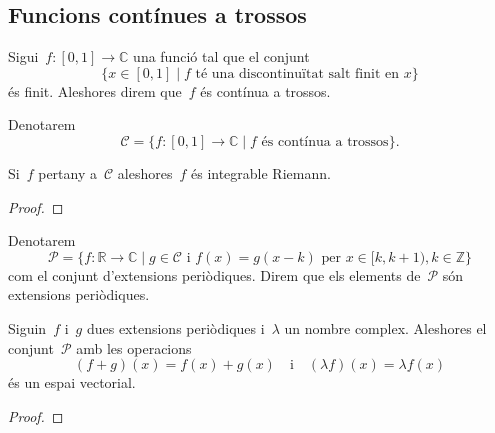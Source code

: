 \documentclass[../../main.tex]{subfiles}
\begin{document}
    \subsection{Funcions contínues a trossos}
    \begin{definition}
        \label{def:funció contínua a trossos}
        Sigui~\(f\colon[0,1]\longrightarrow\mathbb{C}\) una funció tal que el conjunt
        \[
            \{x\in[0,1]\mid f\text{ té una discontinuïtat salt finit en }x\}
        \]
        és finit.
        Aleshores direm que~\(f\) és contínua a trossos.

        Denotarem
        \[
            \mathcal{C}=\{f\colon[0,1]\longrightarrow\mathbb{C}\mid f\text{ és contínua a trossos}\}.
        \]
    \end{definition}
    \begin{observation}
        \label{obs:les funcions contínues a trossos són integrables}
        Si~\(f\) pertany a~\(\mathcal{C}\) aleshores~\(f\) és integrable Riemann.
        \begin{proof}
        \end{proof}
    \end{observation}
    \begin{definition}
        \label{def:conjunt d'extensions periòdiques}
        Denotarem
        \label{def:extensió periòdica}
        \[
            \mathcal{P}=\{f\colon\mathbb{R}\longrightarrow\mathbb{C}\mid g\in\mathcal{C}\text{ i }f(x)=g(x-k)\text{ per }x\in[k,k+1),k\in\mathbb{Z}\}
        \]
        com el conjunt d'extensions periòdiques.
        Direm que els elements de~\(\mathcal{P}\) són extensions periòdiques.
    \end{definition}
    \begin{lemma}
        \label{lema:l'espai d'extensions periòdiques és un espai vectorial}
        Siguin~\(f\) i~\(g\) dues extensions periòdiques i~\(\lambda\) un nombre complex.
        Aleshores el conjunt~\(\mathcal{P}\) amb les operacions
        \[
            (f+g)(x)=f(x)+g(x)\quad\text{i}\quad(\lambda f)(x)=\lambda f(x)
        \]
        és un espai vectorial.
        \begin{proof}
        \end{proof}
    \end{lemma}
\end{document}
